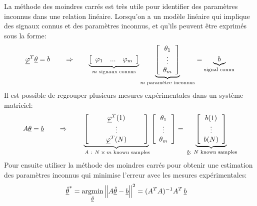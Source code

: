 La méthode des moindres carrés est très utile pour identifier des paramètres inconnus dans une relation linéaire. Lorsqu'on a un modèle linéaire qui implique des signaux connus et des paramètres inconnus, et qu'ils  peuvent être exprimés sous la forme:
\begin{align}
	\underline{\varphi}^T \underline{\theta}
	= b
	\quad\quad\Rightarrow\quad\quad
	\underbrace{
		\left[ \begin{array}{c c c }
				   \varphi_1 & ... & \varphi_m
		\end{array} \right] }_{ m \text{ signaux connus} }
	\underbrace{ \left[ \begin{array}{c}
							\theta_1 \\ \vdots \\ \theta_m
	\end{array} \right] }_{ m \text{ paramètre inconnus} } =
	\underbrace{b}_{\text{signal connu} }
\end{align}
Il est possible de regrouper plusieurs mesures expérimentales dans un système matriciel:
\begin{align}
	A \underline{\theta}
	= \underline{b}
	\quad\quad\Rightarrow\quad\quad
	\underbrace{
		\left[ \begin{array}{c c c c c }
				   && \underline{\varphi}^T(1) && \\
				   && \vdots & \\
				   && \underline{\varphi}^T(N) && \\
		\end{array} \right] }_{\text{ $A$ : $N \times m$  known samples} }
	\left[ \begin{array}{c}
			   \theta_1 \\ \vdots \\ \theta_m
	\end{array} \right]
	= \underbrace{ \left[ \begin{array}{c}
							  b(1) \\ \vdots \\ b(N)\\
	\end{array} \right] }_{ \text{ $\underline{b}$: $N$ known samples} }
\end{align}
Pour ensuite utiliser la méthode des moindres carrés pour obtenir une estimation des paramètres inconnus qui minimise l'erreur avec les mesures expérimentales:
\begin{align}
	\col{\hat{\theta}}^* &= \operatornamewithlimits{argmin}\limits_{\col{\hat{\theta}}} \left\| A \col{\hat{\theta}} - \col{b} \right\|^2
	= (A^T A)^{-1} A^T \, \col{b}
\end{align}



